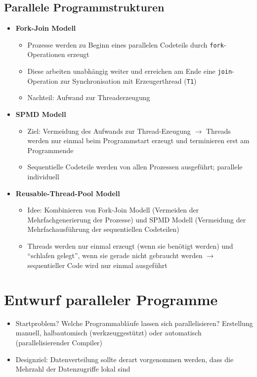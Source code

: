 \subsection{Parallele Programmstrukturen}
\begin{itemize}
	\item \textbf{Fork-Join Modell}
	\begin{itemize}
		\item Prozesse werden zu Beginn eines parallelen Codeteils durch \texttt{fork}-Operationen erzeugt
		\item Diese arbeiten unabhängig weiter und erreichen am Ende eine \texttt{join}-Operation zur Synchronisation mit Erzeugerthread (\texttt{T1})
		\item Nachteil: Aufwand zur Threaderzeugung
	\end{itemize}
	\item \textbf{SPMD Modell}
	\begin{itemize}
		\item Ziel: Vermeidung des Aufwands zur Thread-Ezeugung \(\rightarrow\) Threads werden nur einmal beim Programmstart erzeugt und terminieren erst am Programmende
		\item Sequentielle Codeteile werden von allen Prozessen ausgeführt; parallele individuell
	\end{itemize}
	\item \textbf{Reusable-Thread-Pool Modell}
	\begin{itemize}
		\item Idee: Kombinieren von Fork-Join Modell (Vermeiden der Mehrfachgenerierung der Prozesse) und SPMD Modell (Vermeidung der Mehrfachausführung der sequentiellen Codeteilen)
		\item Threads werden nur einmal erzeugt (wenn sie benötigt werden) und "`schlafen gelegt"', wenn sie gerade nicht gebraucht werden \(\rightarrow\) sequentieller Code wird nur einmal ausgeführt
	\end{itemize}
\end{itemize}



\section{Entwurf paralleler Programme}
\begin{itemize}
	\item Startproblem? Welche Programmabläufe lassen sich parallelisieren? Erstellung manuell, halbautomisch (werkzeuggestützt) oder automatisch (parallelisierender Compiler)
	\item Designziel: Datenverteilung sollte derart vorgenommen werden, dass die Mehrzahl der Datenzugriffe lokal sind
\end{itemize}

